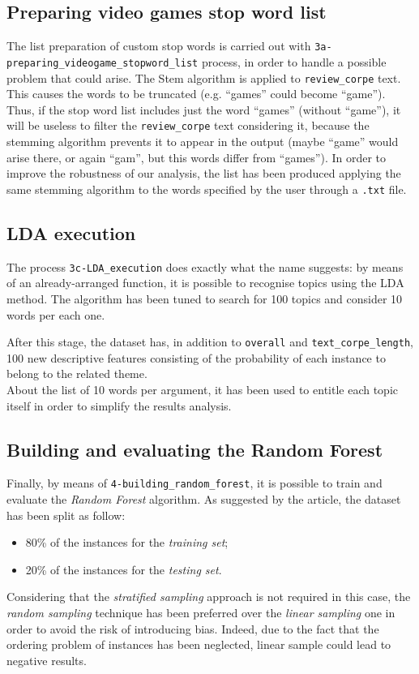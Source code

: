 \documentclass[a4paper]{article}
\begin{document}
 		\subsection{Preparing video games stop word list}
		 	The list preparation of custom stop words is carried out with \verb*|3a-preparing_videogame_stopword_list| process, in order to handle a possible problem that could arise. The Stem algorithm is applied to \verb*|review_corpe| text. This causes the words to be truncated (e.g. ``games'' could become ``game''). Thus, if the stop word list includes just the word ``games'' (without ``game''), it will be useless to filter the \verb*|review_corpe| text considering it, because the stemming algorithm prevents it to appear in the output (maybe ``game'' would arise there, or again ``gam'', but this words differ from ``games''). In order to improve the robustness of our analysis, the list has been produced applying the same stemming algorithm to the words specified by the user through a \verb*|.txt| file.
		 	
		 \subsection{LDA execution}
		 	The process \verb*|3c-LDA_execution| does exactly what the name suggests: by means of an already-arranged function, it is possible to recognise topics using the LDA method. The algorithm has been tuned to search for 100 topics and consider 10 words per each one.
		 	
		 	After this stage, the dataset has, in addition to \verb*|overall| and \verb*|text_corpe_length|, 100 new descriptive features consisting of the probability of each instance to belong to the related theme.\\
		 	About the list of 10 words per argument, it has been used to entitle each topic itself in order to simplify the results analysis.
		 	
		 \subsection{Building and evaluating the Random Forest}
		 	Finally, by means of \verb*|4-building_random_forest|, it is possible to train and evaluate the \emph{Random Forest} algorithm. 
		 	As suggested by the article, the dataset has been split as follow:
		 	\begin{itemize}
			 	\item 80\% of the instances for the \emph{training set};
			 	\item 20\% of the instances for the \emph{testing set}.
		 	\end{itemize}
	 		Considering that the \emph{stratified sampling} approach is not required in this case, the \emph{random sampling} technique has been preferred over the \emph{linear sampling} one in order to avoid the risk of introducing bias. Indeed, due to the fact that the ordering problem of instances has been neglected, linear sample could lead to negative results.
	 		
\end{document}
